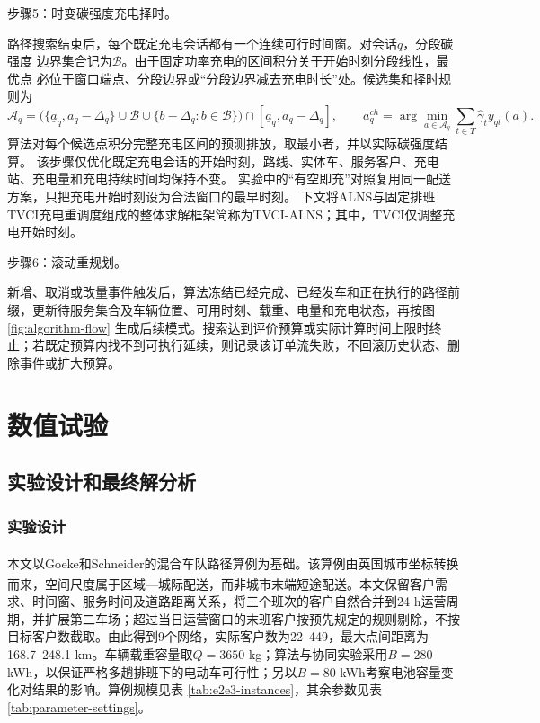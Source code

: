\documentclass{setp-new}
\begin{document}
\noindent 步骤5：时变碳强度充电择时。

路径搜索结束后，每个既定充电会话都有一个连续可行时间窗。对会话$q$，分段碳强度
边界集合记为$\mathcal B$。由于固定功率充电的区间积分关于开始时刻分段线性，最优点
必位于窗口端点、分段边界或“分段边界减去充电时长”处。候选集和择时规则为
\begin{equation}
\mathcal A_q=\bigl(\{\underline a_q,\overline a_q-\Delta_q\}
\cup\mathcal B\cup\{b-\Delta_q:b\in\mathcal B\}\bigr)
\cap[\underline a_q,\overline a_q-\Delta_q],\qquad
a_q^{ch}=\arg\min_{a\in\mathcal A_q}\sum_{t\in T}\widehat\gamma_t y_{qt}(a).
\label{eq:charging-candidates}
\end{equation}
算法对每个候选点积分完整充电区间的预测排放，取最小者，并以实际碳强度结算。
该步骤仅优化既定充电会话的开始时刻，路线、实体车、服务客户、充电站、充电量和充电持续时间均保持不变。
实验中的“有空即充”对照复用同一配送方案，只把充电开始时刻设为合法窗口的最早时刻。
下文将ALNS与固定排班TVCI充电重调度组成的整体求解框架简称为TVCI-ALNS；其中，TVCI仅调整充电开始时刻。

\noindent 步骤6：滚动重规划。

新增、取消或改量事件触发后，算法冻结已经完成、已经发车和正在执行的路径前缀，更新待服务集合及车辆位置、可用时刻、载重、电量和充电状态，再按图 \ref{fig:algorithm-flow} 生成后续模式。搜索达到评价预算或实际计算时间上限时终止；若既定预算内找不到可执行延续，则记录该订单流失败，不回滚历史状态、删除事件或扩大预算。


\section{数值试验}

\subsection{实验设计和最终解分析}

\subsubsection{实验设计}

本文以Goeke和Schneider的混合车队路径算例为基础\textsuperscript{\cite{ref:27,ref:28}}。该算例由英国城市坐标转换而来，空间尺度属于区域—城际配送，而非城市末端短途配送\textsuperscript{\cite{ref:47}}。本文保留客户需求、时间窗、服务时间及道路距离关系，将三个班次的客户自然合并到24 h运营周期，并扩展第二车场；超过当日运营窗口的末班客户按预先规定的规则剔除，不按目标客户数截取。由此得到9个网络，实际客户数为22--449，最大点间距离为168.7--248.1 km。车辆载重容量取$Q=3650$ kg；算法与协同实验采用$B=280$ kWh，以保证严格多趟排班下的电动车可行性；另以$B=80$ kWh考察电池容量变化对结果的影响。算例规模见表 \ref{tab:e2e3-instances}，其余参数见表 \ref{tab:parameter-settings}。
\end{document}

